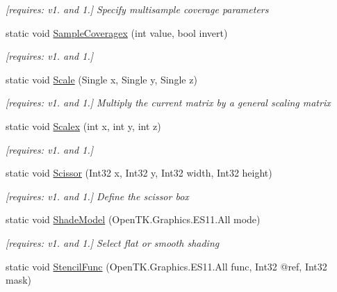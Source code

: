 \begin{DoxyCompactItemize}
\begin{DoxyCompactList}\small\item\em \mbox{[}requires\-: v1. and 1.\mbox{]} Specify multisample coverage parameters \end{DoxyCompactList}\item 
static void \hyperlink{class_open_t_k_1_1_graphics_1_1_e_s11_1_1_g_l_ace3a90452df60b9a9c04c21669d7fc07}{Sample\-Coveragex} (int value, bool invert)
\begin{DoxyCompactList}\small\item\em \mbox{[}requires\-: v1. and 1.\mbox{]}\end{DoxyCompactList}\item 
static void \hyperlink{class_open_t_k_1_1_graphics_1_1_e_s11_1_1_g_l_a47ee8724c593ec997a5ad346eb17224c}{Scale} (Single x, Single y, Single z)
\begin{DoxyCompactList}\small\item\em \mbox{[}requires\-: v1. and 1.\mbox{]} Multiply the current matrix by a general scaling matrix \end{DoxyCompactList}\item 
static void \hyperlink{class_open_t_k_1_1_graphics_1_1_e_s11_1_1_g_l_ae3b8a8d398c722e6aaf73204064d40c9}{Scalex} (int x, int y, int z)
\begin{DoxyCompactList}\small\item\em \mbox{[}requires\-: v1. and 1.\mbox{]}\end{DoxyCompactList}\item 
static void \hyperlink{class_open_t_k_1_1_graphics_1_1_e_s11_1_1_g_l_a05c3d7c61af4d6e947bc198b7bd2398d}{Scissor} (Int32 x, Int32 y, Int32 width, Int32 height)
\begin{DoxyCompactList}\small\item\em \mbox{[}requires\-: v1. and 1.\mbox{]} Define the scissor box \end{DoxyCompactList}\item 
static void \hyperlink{class_open_t_k_1_1_graphics_1_1_e_s11_1_1_g_l_a9d5cc17411c99c1e287d6d887b5fe888}{Shade\-Model} (Open\-T\-K.\-Graphics.\-E\-S11.\-All mode)
\begin{DoxyCompactList}\small\item\em \mbox{[}requires\-: v1. and 1.\mbox{]} Select flat or smooth shading \end{DoxyCompactList}\item 
static void \hyperlink{class_open_t_k_1_1_graphics_1_1_e_s11_1_1_g_l_a5055bce9dece4d7922dde32049641539}{Stencil\-Func} (Open\-T\-K.\-Graphics.\-E\-S11.\-All func, Int32 @ref, Int32 mask)

\end{DoxyCompactItemize}
